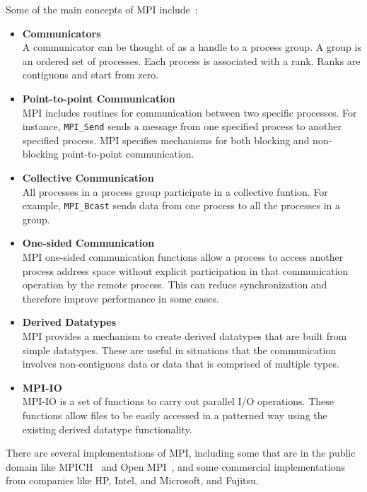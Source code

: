 Some of the main concepts of MPI include~\cite{snir1998mpi,geist1996mpi,walker1996mpi,gropp1999using}:
\begin{itemize}
\item \textbf{Communicators}\\
  A communicator can be thought of as a handle to a process group. A group is an ordered set of processes. Each process is associated with a rank. Ranks are contiguous and start from zero.
  
\item \textbf{Point-to-point Communication}\\
  MPI includes routines for communication between two specific processes. For instance, \verb|MPI_Send| sends a message from one specified process to another specified process. MPI specifies mechanisms for both blocking and non-blocking point-to-point communication. 

\item \textbf{Collective Communication}\\
  All processes in a process group participate in a collective funtion. For example, \verb|MPI_Bcast| sends data from one process to all the processes in a group.
  
\item \textbf{One-sided Communication}\\
  MPI one-sided communication functions allow a process to access another process address space without explicit participation in that communication operation by the remote process. This can reduce synchronization and therefore improve performance in some cases.
  
\item \textbf{Derived Datatypes}\\
  MPI provides a mechanism to create derived datatypes that are built from simple datatypes. These are useful in situations that the communication involves non-contiguous data or data that is comprised of multiple types.

\item \textbf{MPI-IO}\\
  MPI-IO is a set of functions to carry out parallel I/O operations. These functions allow files to be easily accessed in a patterned way using the existing derived datatype functionality.
  
\end{itemize}

There are several implementations of MPI, including some that are in the public domain like MPICH~\cite{gropp2002mpich2} and Open MPI~\cite{gabriel04:_open_mpi}, and some commercial implementations from companies like HP, Intel, and Microsoft, and Fujitsu.


